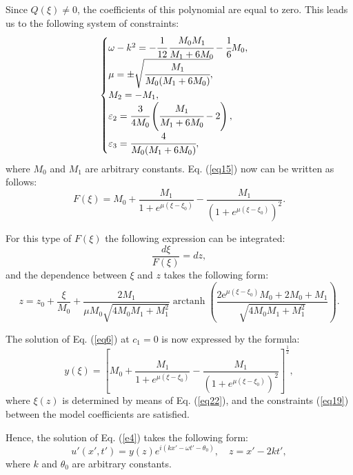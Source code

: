 \documentclass[preprint,12pt]{elsarticle}
\DeclareMathOperator\arctanh{arctanh}
\begin{document}
Since \(Q(\xi) \neq 0\), the coefficients of this polynomial are equal to zero. This leads us to the following system of constraints:
\begin{equation}\label{eq19}
\begin{cases}
\omega-k^{2} = -\cfrac{1}{12}\,\cfrac{M_{0} M_{1}}{M_{1}+6M_{0}} -\cfrac{1}{6} M_{0},\\
\mu=\pm \sqrt{\cfrac{M_{1}}{M_{0}(M_{1}+6M_{0})}},\\
M_{2}=-M_{1},\\
\varepsilon_{2} = \cfrac{3}{4 M_{0}}\left(\cfrac{M_{1}}{M_{1}+6M_{0}}-2\right),\\
\varepsilon_{3}= \cfrac{4}{M_{0}(M_{1}+6M_{0})},
\end{cases}
\end{equation}
where \(M_{0}\) and \(M_{1}\) are arbitrary constants. Eq. (\ref{eq15}) now can be written as follows:
\begin{equation}
F(\xi)=M_{0}+\frac{M_{1}}{1+e^{\mu(\xi-\xi_{0})}}-\frac{M_{1}}{\left(1+e^{\mu(\xi-\xi_{0})}\right)^{2}}.
\end{equation}

For this type of \(F(\xi)\) the following expression can be integrated:
\begin{equation}
\frac{d \xi}{F(\xi)}=dz,
\end{equation}
and the dependence between \(\xi\) and \(z\) takes the following form:
\begin{equation} \label{eq22}
z=z_{0}+\frac{\xi}{M_{0}}+\frac{2 M_{1}}{\mu M_{0} \sqrt{4 M_{0} M_{1}+M_{1}^{2}}} \arctanh \left(\frac{2 {\mathrm e}^{\mu (\xi-\xi_{0})} M_{0}+2 M_{0}+M_{1}}{\sqrt{4 M_{0} M_{1}+M_{1}^{2}}}\right).
\end{equation}

The solution of Eq. (\ref{eq6}) at \(c_{1}=0\) is now expressed by the formula:
\begin{equation}\label{eq23}
y(\xi)=\left[ M_{0}+\frac{M_{1}}{1+e^{\mu(\xi-\xi_{0})}}-\frac{M_{1}}{\left(1+e^{\mu\left(\xi-\xi_{0}\right)}\right)^{2}}\right]^{\frac{1}{2}},
\end{equation}
where \(\xi(z)\) is determined by means of Eq. (\ref{eq22}), and the constraints (\ref{eq19}) between the model coefficients are satisfied.

Hence, the solution of Eq. (\ref{e4}) takes the following form:
\begin{equation}\label{eq24}
u'(x',t')=y(z)e^{i(kx'-\omega t'-\theta_{0})}, \quad z=x'-2kt',
\end{equation}
where \(k\) and \(\theta_{0}\) are arbitrary constants. 
\end{document}
